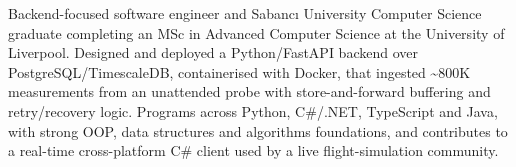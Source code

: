 



Backend-focused software engineer and Sabancı University Computer Science graduate completing an MSc in Advanced Computer Science at the University of Liverpool. Designed and deployed a Python/FastAPI backend over PostgreSQL/TimescaleDB, containerised with Docker, that ingested \textasciitilde 800K measurements from an unattended probe with store-and-forward buffering and retry/recovery logic. Programs across Python, C\#/.NET, TypeScript and Java, with strong OOP, data structures and algorithms foundations, and contributes to a real-time cross-platform C\# client used by a live flight-simulation community.




